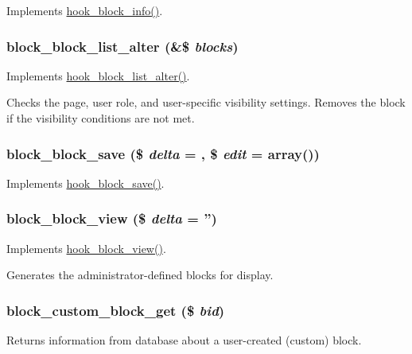 \label{block_8module_a95565cfe7f2b05d193193401ea736a13}
Implements \hyperlink{group__hooks_ga2bd926c3e90deeba0c3ba64fb3c64d73}{hook\_\-block\_\-info()}. \hypertarget{block_8module_aa38c3faa83302a05ec260a6874e745d8}{
\subsubsection[{block\_\-block\_\-list\_\-alter}]{\setlength{\rightskip}{0pt plus 5cm}block\_\-block\_\-list\_\-alter (\&\$ {\em blocks})}}
\label{block_8module_aa38c3faa83302a05ec260a6874e745d8}
Implements \hyperlink{group__hooks_gaf38c7633b52b18831e3ec0459d8e9f41}{hook\_\-block\_\-list\_\-alter()}.

Checks the page, user role, and user-\/specific visibility settings. Removes the block if the visibility conditions are not met. \hypertarget{block_8module_af0ede6201f8b5159ef74a1fa1df283c2}{
\subsubsection[{block\_\-block\_\-save}]{\setlength{\rightskip}{0pt plus 5cm}block\_\-block\_\-save (\$ {\em delta} = {}, \/  \$ {\em edit} = {\ttfamily array()})}}
\label{block_8module_af0ede6201f8b5159ef74a1fa1df283c2}
Implements \hyperlink{group__hooks_ga622024ce4f818c241ca7a765e829f928}{hook\_\-block\_\-save()}. \hypertarget{block_8module_ae67bf125a478508e2b301bb0b25e181e}{
\subsubsection[{block\_\-block\_\-view}]{\setlength{\rightskip}{0pt plus 5cm}block\_\-block\_\-view (\$ {\em delta} = {\ttfamily ''})}}
\label{block_8module_ae67bf125a478508e2b301bb0b25e181e}
Implements \hyperlink{group__hooks_gaa14092a3e74cdc57aa295100cfd6860d}{hook\_\-block\_\-view()}.

Generates the administrator-\/defined blocks for display. \hypertarget{block_8module_a2303e104471351f6d8916d4cfc71b18d}{
\subsubsection[{block\_\-custom\_\-block\_\-get}]{\setlength{\rightskip}{0pt plus 5cm}block\_\-custom\_\-block\_\-get (\$ {\em bid})}}
\label{block_8module_a2303e104471351f6d8916d4cfc71b18d}
Returns information from database about a user-\/created (custom) block.


